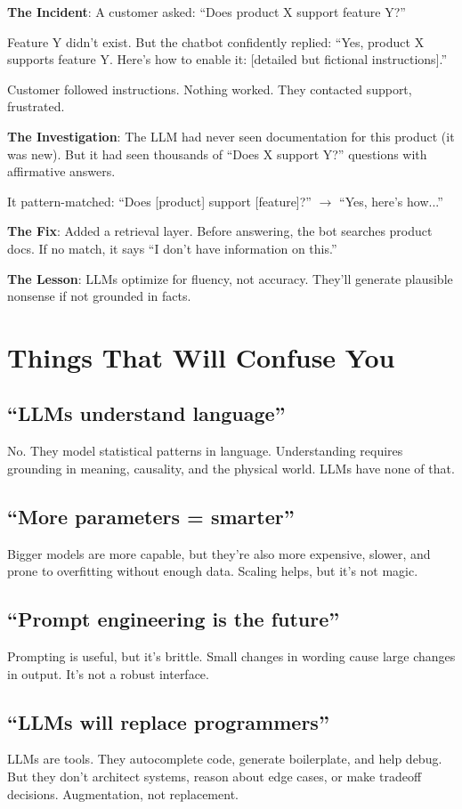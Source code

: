 \documentclass[11pt,oneside]{book}
\begin{document}
\textbf{The Incident}: A customer asked: ``Does product X support feature Y?''

Feature Y didn't exist. But the chatbot confidently replied: ``Yes, product X supports feature Y. Here's how to enable it: [detailed but fictional instructions].''

Customer followed instructions. Nothing worked. They contacted support, frustrated.

\textbf{The Investigation}: The LLM had never seen documentation for this product (it was new). But it had seen thousands of ``Does X support Y?'' questions with affirmative answers.

It pattern-matched: ``Does [product] support [feature]?'' $\to$ ``Yes, here's how...''

\textbf{The Fix}: Added a retrieval layer. Before answering, the bot searches product docs. If no match, it says ``I don't have information on this.''

\textbf{The Lesson}: LLMs optimize for fluency, not accuracy. They'll generate plausible nonsense if not grounded in facts.

\section{Things That Will Confuse You}

\subsection{``LLMs understand language''}
No. They model statistical patterns in language. Understanding requires grounding in meaning, causality, and the physical world. LLMs have none of that.

\subsection{``More parameters = smarter''}
Bigger models are more capable, but they're also more expensive, slower, and prone to overfitting without enough data. Scaling helps, but it's not magic.

\subsection{``Prompt engineering is the future''}
Prompting is useful, but it's brittle. Small changes in wording cause large changes in output. It's not a robust interface.

\subsection{``LLMs will replace programmers''}
LLMs are tools. They autocomplete code, generate boilerplate, and help debug. But they don't architect systems, reason about edge cases, or make tradeoff decisions. Augmentation, not replacement.
\end{document}
